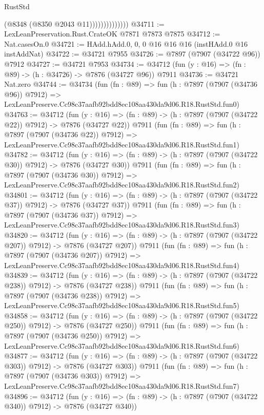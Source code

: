 \begin{lexlean}{RustStd}
\begin{coremodule}
                            (@8348 (@8350 @2043 @11))))))))))))))
@34711 := LexLeanPreservation.Rust.CrateOK @7871 @7873 @7875
@34712 := Nat.casesOn.{0}
@34721 := HAdd.hAdd.{0, 0, 0} @16 @16 @16 (instHAdd.{0} @16 instAddNat)
@34722 := @34721 @7955
@34726 := @7897 (@7907 (@34722 @96)) @7912
@34727 := @34721 @7953
@34734 := @34712 (fun (y : @16) => (fn : @89) -> (h : @34726) -> @7876 (@34727 @96)) @7911
@34736 := @34721 Nat.zero
@34744 := @34734
    (fun (fn : @89) =>
    fun (h : @7897 (@7907 (@34736 @96)) @7912) =>
    LexLeanPreserve.Cc98c37aafb92bdd8ec108aa430da9d06.R18.RustStd.fun0)
@34763 := @34712
    (fun (y : @16) => (fn : @89) -> (h : @7897 (@7907 (@34722 @22)) @7912) -> @7876 (@34727 @22))
    @7911
    (fun (fn : @89) =>
    fun (h : @7897 (@7907 (@34736 @22)) @7912) =>
    LexLeanPreserve.Cc98c37aafb92bdd8ec108aa430da9d06.R18.RustStd.fun1)
@34782 := @34712
    (fun (y : @16) => (fn : @89) -> (h : @7897 (@7907 (@34722 @30)) @7912) -> @7876 (@34727 @30))
    @7911
    (fun (fn : @89) =>
    fun (h : @7897 (@7907 (@34736 @30)) @7912) =>
    LexLeanPreserve.Cc98c37aafb92bdd8ec108aa430da9d06.R18.RustStd.fun2)
@34801 := @34712
    (fun (y : @16) => (fn : @89) -> (h : @7897 (@7907 (@34722 @37)) @7912) -> @7876 (@34727 @37))
    @7911
    (fun (fn : @89) =>
    fun (h : @7897 (@7907 (@34736 @37)) @7912) =>
    LexLeanPreserve.Cc98c37aafb92bdd8ec108aa430da9d06.R18.RustStd.fun3)
@34820 := @34712
    (fun (y : @16) => (fn : @89) -> (h : @7897 (@7907 (@34722 @207)) @7912) -> @7876 (@34727 @207))
    @7911
    (fun (fn : @89) =>
    fun (h : @7897 (@7907 (@34736 @207)) @7912) =>
    LexLeanPreserve.Cc98c37aafb92bdd8ec108aa430da9d06.R18.RustStd.fun4)
@34839 := @34712
    (fun (y : @16) => (fn : @89) -> (h : @7897 (@7907 (@34722 @238)) @7912) -> @7876 (@34727 @238))
    @7911
    (fun (fn : @89) =>
    fun (h : @7897 (@7907 (@34736 @238)) @7912) =>
    LexLeanPreserve.Cc98c37aafb92bdd8ec108aa430da9d06.R18.RustStd.fun5)
@34858 := @34712
    (fun (y : @16) => (fn : @89) -> (h : @7897 (@7907 (@34722 @250)) @7912) -> @7876 (@34727 @250))
    @7911
    (fun (fn : @89) =>
    fun (h : @7897 (@7907 (@34736 @250)) @7912) =>
    LexLeanPreserve.Cc98c37aafb92bdd8ec108aa430da9d06.R18.RustStd.fun6)
@34877 := @34712
    (fun (y : @16) => (fn : @89) -> (h : @7897 (@7907 (@34722 @303)) @7912) -> @7876 (@34727 @303))
    @7911
    (fun (fn : @89) =>
    fun (h : @7897 (@7907 (@34736 @303)) @7912) =>
    LexLeanPreserve.Cc98c37aafb92bdd8ec108aa430da9d06.R18.RustStd.fun7)
@34896 := @34712
    (fun (y : @16) => (fn : @89) -> (h : @7897 (@7907 (@34722 @340)) @7912) -> @7876 (@34727 @340))

\end{coremodule}
\end{lexlean}
